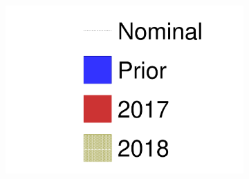 \begin{figure}[h]
\begin{subfigure}[t]{0.32\textwidth}
	\end{subfigure}
	\begin{subfigure}[t]{0.32\textwidth}
		\includegraphics[width=\textwidth, trim={0mm 0mm 0mm 0mm}, clip, page=6]{figures/mach3/2018/data/prior_error_1june_try_2017_fit_on_sk_spectra_2018_results_test_spectra}
	\end{subfigure}
	

\end{figure}
